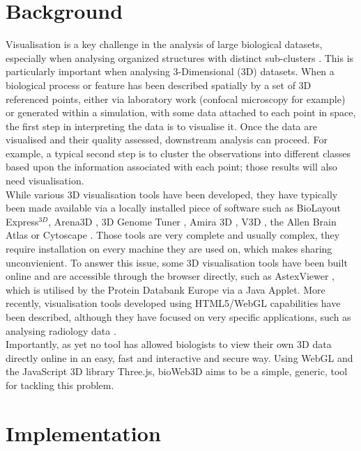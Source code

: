 \documentclass[10pt]{bmc_article}
\newenvironment{bmcformat}{\baselineskip20pt\sloppy\setboolean{publ}{false}}{\baselineskip20pt\sloppy}
\begin{document}
\begin{bmcformat}
\section{Background}

Visualisation is a key challenge in the analysis of large biological datasets, especially when analysing organized structures with distinct sub-clusters \cite{Rubel10}. This is particularly important when analysing 3-Dimensional (3D) datasets. When a biological process or feature has been described spatially by a set of 3D referenced points, either via laboratory work (confocal microscopy for example) or generated within a simulation, with some data attached to each point in space, the first step in interpreting the data is to visualise it. Once the data are visualised and their quality assessed, downstream analysis can proceed. For example, a typical second step is to cluster the observations into different classes based upon the information associated with each point; those results will also need visualisation. \\
While various 3D visualisation tools have been developed, they have typically been made available via a locally installed piece of software such as BioLayout Express$^{3D}$\cite{Freeman07}, Arena3D \cite{Pavlopoulos08},  3D Genome Tuner \cite{Wang09}, Amira 3D \cite{Stalling05}, V3D \cite{Peng10}, the Allen Brain Atlas \cite{Lein07} or Cytoscape \cite{Shannon03}. Those tools are very complete and usually complex, they require installation on every machine they are used on, which makes sharing unconvienient. To answer this issue, some 3D visualisation tools have been built online and are accessible through the browser directly, such as AstexViewer \cite{Hartshorn02}, which is utilised by the Protein Databank Europe via a Java Applet. More recently, visualisation tools developed using HTML5/WebGL capabilities have been described, although they have focused on very specific applications, such as analysing radiology data  \cite{Dinesh12}.\\
Importantly, as yet no tool has allowed biologists to view their own 3D data directly online in an easy, fast and interactive and secure way. Using WebGL and the JavaScript 3D library Three.js, bioWeb3D aims to be a simple, generic, tool for tackling this problem.\\






\section{Implementation}


\end{bmcformat}
\end{document}
